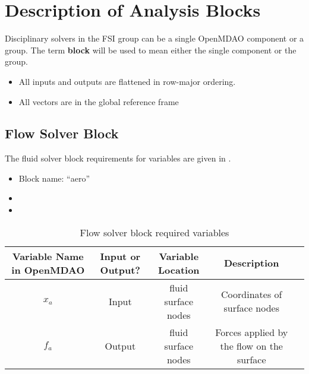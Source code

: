 \documentclass{article}
\begin{document}
\section{Description of Analysis Blocks}
\label{sect:analysis_blocks}

Disciplinary solvers in the FSI group can be a single OpenMDAO component or a group.
The term \textbf{block} will be used to mean either the single component or the group.


\begin{itemize}
  \item All inputs and outputs are flattened in row-major ordering.
  \item All vectors are in the global reference frame
\end{itemize}

\FloatBarrier
\subsection{Flow Solver Block}

The fluid solver block requirements for variables are given in .

\begin{itemize}
\item Block name: ``aero''
\end{itemize}

\begin{itemize}
\item {}
\item {}
\end{itemize}

\begin{table}[H]
  \centering
  \caption{Flow solver block required variables}
  \label{tab:flow_vars}
  \begin{tabular}{c|c|c|c|c}
    Variable Name in OpenMDAO & Input or Output? & Variable Location   & Description \\
    \midrule
    $x_a$                     & Input            & fluid surface nodes & Coordinates of surface nodes \\
    $f_a$                     & Output           & fluid surface nodes & Forces applied by the flow on the surface \\
  \end{tabular}
\end{table}
\end{document}
